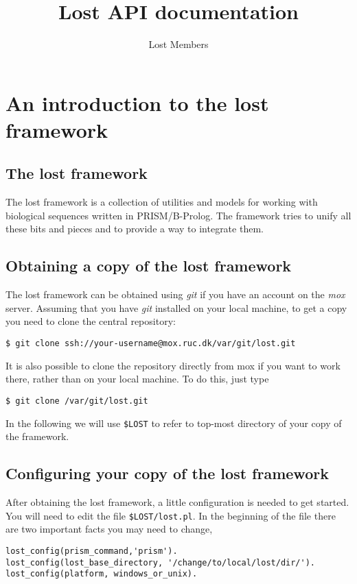 \documentclass{book}
\title{Lost API documentation}
\author{Lost Members}
\begin{document}
\maketitle


\tableofcontents
%

\chapter{An introduction to the lost framework}

\section{The lost framework}

The lost framework is a collection of utilities and models for
working with biological sequences written in PRISM/B-Prolog. 
The framework tries to unify all these bits and pieces and to
provide a way to integrate them.

\section{Obtaining a copy of the lost framework}

The lost framework can be obtained using \emph{git} if you have an account on the
\emph{mox} server. Assuming that you have \emph{git} installed on your
local machine, to get a copy you need to clone the central repository:
\begin{verbatim}
$ git clone ssh://your-username@mox.ruc.dk/var/git/lost.git
\end{verbatim}

It is also possible to clone the repository directly from mox if you
want to work there, rather than on your local machine. To do this,
just type 
\begin{verbatim}
$ git clone /var/git/lost.git
\end{verbatim}

In the following we will use \texttt{\$LOST} to refer to top-most
directory of your copy of the framework. 


\section{Configuring your copy of the lost framework}


After obtaining the lost framework, a little configuration is needed to get started.
You will need to edit the file \texttt{\$LOST/lost.pl}.
In the beginning of the file there are two important facts you may need to change,
\begin{verbatim}
lost_config(prism_command,'prism').
lost_config(lost_base_directory, '/change/to/local/lost/dir/').
lost_config(platform, windows_or_unix).
\end{verbatim}
\end{document}
